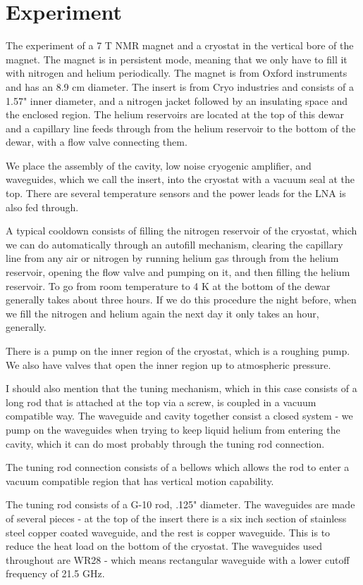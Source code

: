 \documentclass[11pt]{article}
\begin{document}
\section{Experiment}

The experiment of a 7 T NMR magnet and a cryostat in the vertical bore of the magnet. The magnet is in persistent mode, meaning that we only have to fill it with nitrogen and helium periodically. The magnet is from Oxford instruments and has an 8.9 cm diameter. The insert is from Cryo industries and consists of a 1.57" inner diameter, and a nitrogen jacket followed by an insulating space and the enclosed region. The helium reservoirs are located at the top of this dewar and a capillary line feeds through from the helium reservoir to the bottom of the dewar, with a flow valve connecting them.

We place the assembly of the cavity, low noise cryogenic amplifier, and waveguides, which we call the insert, into the cryostat with a vacuum seal at the top. There are several temperature sensors and the power leads for the LNA is also fed through.

A typical cooldown consists of filling the nitrogen reservoir of the cryostat, which we can do automatically through an autofill mechanism, clearing the capillary line from any air or nitrogen by running helium gas through from the helium reservoir, opening the flow valve and pumping on it, and then filling the helium reservoir. To go from room temperature to 4 K at the bottom of the dewar generally takes about three hours. If we do this procedure the night before, when we fill the nitrogen and helium again the next day it only takes an hour, generally.

There is a pump on the inner region of the cryostat, which is a roughing pump. We also have valves that open the inner region up to atmospheric pressure.

I should also mention that the tuning mechanism, which in this case consists of a long rod that is attached at the top via a screw, is coupled in a vacuum compatible way. The waveguide and cavity together consist a closed system - we pump on the waveguides when trying to keep liquid helium from entering the cavity, which it can do most probably through the tuning rod connection. 

The tuning rod connection consists of a bellows which allows the rod to enter a vacuum compatible region that has vertical motion capability.

The tuning rod consists of a G-10 rod, .125" diameter. The waveguides are made of several pieces - at the top of the insert there is a six inch section of stainless steel copper coated waveguide, and the rest is copper waveguide. This is to reduce the heat load on the bottom of the cryostat. The waveguides used throughout are WR28 - which means rectangular waveguide with a lower cutoff frequency of 21.5 GHz.
\end{document}
